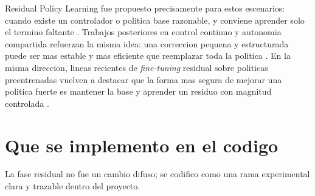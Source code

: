 \documentclass[11pt,a4paper]{article}
\begin{document}
Residual Policy Learning fue propuesto precisamente para estos escenarios: cuando existe un controlador o politica base razonable, y conviene aprender solo el termino faltante \cite{silver2018residual}. Trabajos posteriores en control continuo y autonomia compartida refuerzan la misma idea: una correccion pequena y estructurada puede ser mas estable y mas eficiente que reemplazar toda la politica \cite{schaff2020shared}. En la misma direccion, lineas recientes de \emph{fine-tuning} residual sobre politicas preentrenadas vuelven a destacar que la forma mas segura de mejorar una politica fuerte es mantener la base y aprender un residuo con magnitud controlada \cite{resfit2025}.

\section{Que se implemento en el codigo}

La fase residual no fue un cambio difuso; se codifico como una rama experimental clara y trazable dentro del proyecto.
\end{document}
